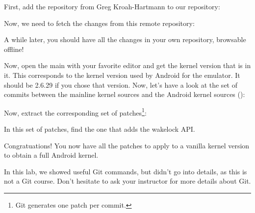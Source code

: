 First, add the  repository from Greg Kroah-Hartmann
to our repository:


Now, we need to fetch the changes from this remote repository:


A while later, you should have all the changes in your own repository,
browsable offline!

Now, open the main  with your favorite editor and get
the kernel version that is in it. This corresponds to the kernel version
used by Android for the emulator. It should be 2.6.29 if you chose that
version. Now, let's have a look at the set of commits between the
mainline kernel sources and the Android kernel sources ():


Now, extract the corresponding set of patches\footnote{Git generates
  one patch per commit.}:


In this set of patches, find the one that adds the wakelock API.

Congratuations! You now have all the patches to apply to a vanilla
kernel version to obtain a full Android kernel.

In this lab, we showed useful Git commands, but didn't go into
details, as this is not a Git course. Don't hesitate to ask your
instructor for more details about Git.
